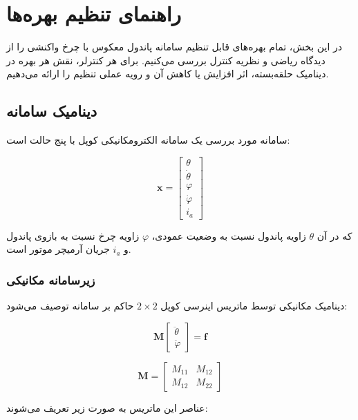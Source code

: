 \section{راهنمای تنظیم بهره‌ها}

در این بخش، تمام بهره‌های قابل تنظیم سامانه پاندول معکوس با چرخ واکنشی را از دیدگاه ریاضی و نظریه کنترل بررسی می‌کنیم. برای هر کنترلر، نقش هر بهره در دینامیک حلقه‌بسته، اثر افزایش یا کاهش آن و رویه عملی تنظیم را ارائه می‌دهیم.

\subsection{دینامیک سامانه}

سامانه مورد بررسی یک سامانه الکترومکانیکی کوپل با پنج حالت است:

\begin{equation}
\mathbf{x} = \begin{bmatrix} \theta \\ \dot{\theta} \\ \varphi \\ \dot{\varphi} \\ i_a \end{bmatrix}
\end{equation}

که در آن $\theta$ زاویه پاندول نسبت به وضعیت عمودی، $\varphi$ زاویه چرخ نسبت به بازوی پاندول و $i_a$ جریان آرمیچر موتور است.

\subsubsection{زیرسامانه مکانیکی}

دینامیک مکانیکی توسط ماتریس اینرسی کوپل $2\times2$ حاکم بر سامانه توصیف می‌شود:

\begin{equation}
\mathbf{M}\begin{bmatrix} \ddot{\theta} \\ \ddot{\varphi} \end{bmatrix} = \mathbf{f}
\end{equation}

\begin{equation}
\mathbf{M} = \begin{bmatrix} M_{11} & M_{12} \\ M_{12} & M_{22} \end{bmatrix}
\end{equation}

عناصر این ماتریس به صورت زیر تعریف می‌شوند:

